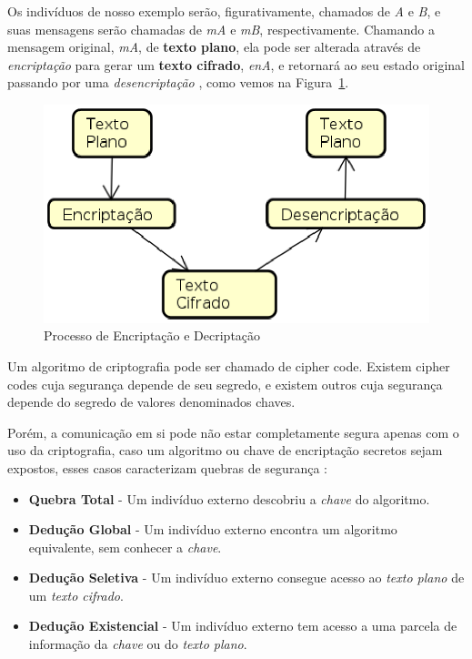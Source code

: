 	Os indivíduos de nosso exemplo serão, figurativamente, chamados de \textit{A} e \textit{B}, e suas mensagens serão chamadas de \textit{mA} e \textit{mB}, respectivamente. Chamando a mensagem original, \textit{mA}, de \textbf{texto plano}, ela pode ser alterada através de \textit{encriptação} para gerar um \textbf{texto cifrado}, \textit{enA}, e retornará ao seu estado original passando por uma \textit{desencriptação} \cite[p.~15]{schneier96}, como vemos na Figura~\ref{fig:img01}.

	\begin{figure}[h]
		\centering
		\includegraphics[keepaspectratio=true,scale=0.5]{figuras/proc.eps}
		\caption{Processo de Encriptação e Decriptação}
		\label{fig:img01}
	\end{figure}

	Um algoritmo de criptografia pode ser chamado de cipher code. Existem cipher codes cuja segurança depende de seu segredo, e existem outros cuja segurança depende do segredo de valores denominados chaves.
	
	Porém, a comunicação em si pode não estar completamente segura apenas com o uso da criptografia, caso um algoritmo ou chave de encriptação secretos sejam expostos, esses casos caracterizam quebras de segurança \cite[p.~399]{stallings11}:
	
	\begin{itemize}
		\item \textbf{Quebra Total} - Um indivíduo externo descobriu a \textit{chave} do algoritmo.
		\item \textbf{Dedução Global} - Um indivíduo externo encontra um algoritmo equivalente, sem conhecer a \textit{chave}.
		\item \textbf{Dedução Seletiva} - Um indivíduo externo consegue acesso ao \textit{texto plano} de um \textit{texto cifrado}.
		\item \textbf{Dedução Existencial} - Um indivíduo externo tem acesso a uma parcela de informação da \textit{chave} ou do \textit{texto plano}. 
	\end{itemize}

